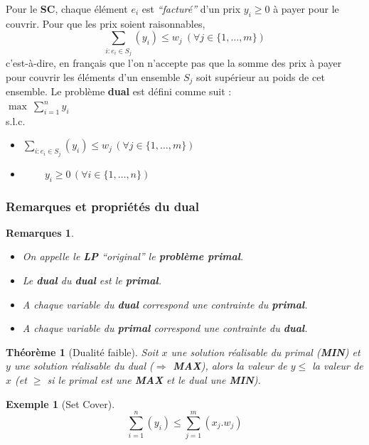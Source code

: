 \documentclass{article}
\newcommand{\titre}[1]{\textcolor{title}{#1}}
\newtheorem{exemple}{Exemple}[section]
\newtheorem{rems}{Remarques}[section]
\newtheorem{thm}{Th\'eor\`eme}[section]
\begin{document}
\begin{sffamily}
Pour le \textbf{\titre{SC}}, chaque élément $e_i$ est \textit{``facturé''} d'un
prix $y_i \geq 0$ à payer pour le couvrir. Pour que les prix soient
raisonnables,
$$\sum_{i:e_i\in S_j} (y_i) \leq w_j\ (\forall j \in \{1,...,m\})$$
c'est-à-dire, en français que l'on n'accepte pas que la somme des prix à payer
pour couvrir les éléments d'un ensemble $S_j$ soit supérieur au poids de cet
ensemble. Le problème \textbf{dual} est défini comme suit :\\

$\max\ \sum_{i=1}^n y_i$ \\
\indent s.l.c.
\begin{itemize}
\item $\sum_{i:e_i \in S_j}(y_i) \leq w_j\, (\forall j \in \{1,\ldots ,m\})$ \\
\item $\qquad\ y_i \geq 0\, (\forall i \in \{1,\ldots ,n\})$
\end{itemize}

\subsubsection{Remarques et propriétés du dual}

\begin{rems}
\begin{itemize}
\item On appelle le \textbf{\titre{LP}} ``original'' le
\textbf{problème primal}.
\item Le \textbf{dual} du \textbf{dual} est le \textbf{primal}.
\item A chaque variable du \textbf{dual} correspond une contrainte du
\textbf{primal}.
\item A chaque variable du \textbf{primal} correspond une contrainte du
\textbf{dual}.
\end{itemize}
\end{rems}

\begin{thm}[\titre{Dualité faible}] Soit $x$ une solution réalisable du primal
(\textbf{MIN}) et $y$ une solution réalisable du dual (\textbf{$\Rightarrow$
MAX}), alors la valeur de $y \leq$ la valeur de $x$ (et $\geq$ si le primal est
une \textbf{MAX} et le dual une \textbf{MIN}).
\end{thm}

\begin{exemple}[Set Cover]
$$\sum_{i=1}^n(y_i) \leq \sum^m_{j=1} (x_j.w_j)$$
\end{exemple}


\end{sffamily}
\end{document}
